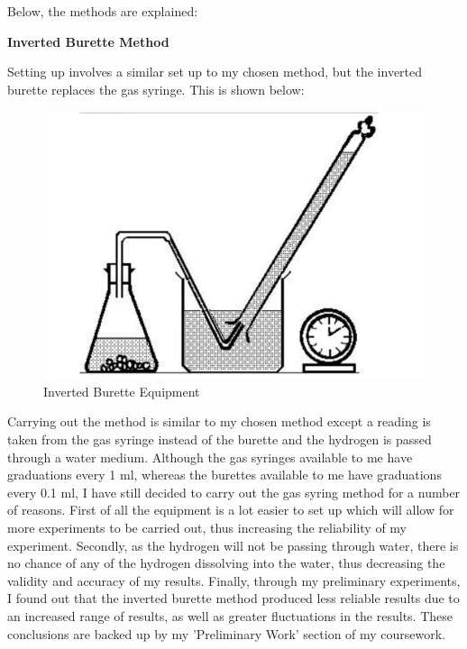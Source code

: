 Below, the methods are explained:

\textbf{Inverted Burette Method}



Setting up involves a similar set up to my chosen method, but the inverted burette replaces the gas syringe. This is shown below:

\begin{figure}[H]
    \includegraphics[width=\textwidth]{./Planning/Images/InvertedBurette.pdf}
    \caption{Inverted Burette Equipment} \label{fig:Inverted Burette}
\end{figure}


Carrying out the method is similar to my chosen method except a reading is taken from the gas syringe instead of the burette and the hydrogen is passed through a water medium. Although the gas syringes available to me have graduations every 1 ml, whereas the burettes available to me have graduations every 0.1 ml, I have still decided to carry out the gas syring method for a number of reasons. First of all the equipment is a lot easier to set up which will allow for more experiments to be carried out, thus increasing the reliability of my experiment. Secondly, as the hydrogen will not be passing through water, there is no chance of any of the hydrogen dissolving into the water, thus decreasing the validity and accuracy of my results. Finally, through my preliminary experiments, I found out that the inverted burette method produced less reliable results due to an increased range of results, as well as greater fluctuations in the results. These conclusions are backed up by my 'Preliminary Work' section of my coursework. 

